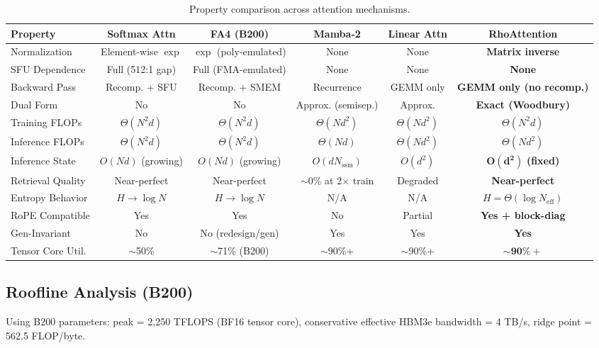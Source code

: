 \documentclass[11pt,a4paper]{article}
\theoremstyle{remark}
\begin{document}
\begin{table}[h]
\centering
\caption{Property comparison across attention mechanisms.}
\scriptsize
\begin{tabular}{lccccc}
\toprule
\textbf{Property} & \textbf{Softmax Attn} & \textbf{FA4 (B200)} & \textbf{Mamba-2} & \textbf{Linear Attn} & \textbf{RhoAttention} \\
\midrule
Normalization & Element-wise $\exp$ & $\exp$ (poly-emulated) & None & None & \textbf{Matrix inverse} \\
SFU Dependence & Full (512:1 gap) & Full (FMA-emulated) & None & None & \textbf{None} \\
Backward Pass & Recomp. + SFU & Recomp. + SMEM & Recurrence & GEMM only & \textbf{GEMM only (no recomp.)} \\
Dual Form & No & No & Approx. (semisep.) & Approx. & \textbf{Exact (Woodbury)} \\
Training FLOPs & $\Theta(N^2 d)$ & $\Theta(N^2 d)$ & $\Theta(N d^2)$ & $\Theta(N d^2)$ & $\Theta(N^2 d)$ \\
Inference FLOPs & $\Theta(N^2 d)$ & $\Theta(N^2 d)$ & $\Theta(N d)$ & $\Theta(N d^2)$ & $\Theta(N d^2)$ \\
Inference State & $O(Nd)$ (growing) & $O(Nd)$ (growing) & $O(d N_{\text{ssm}})$ & $O(d^2)$ & $\mathbf{O(d^2)}$ \textbf{(fixed)} \\
Retrieval Quality & Near-perfect & Near-perfect & $\sim$0\% at 2$\times$ train & Degraded & \textbf{Near-perfect} \\
Entropy Behavior & $H \to \log N$ & $H \to \log N$ & N/A & N/A & \textbf{$H = \Theta(\log N_{\text{eff}})$} \\
RoPE Compatible & Yes & Yes & No & Partial & \textbf{Yes + block-diag} \\
Gen-Invariant & No & No (redesign/gen) & Yes & Yes & \textbf{Yes} \\
Tensor Core Util. & $\sim$50\% & $\sim$71\% (B200) & $\sim$90\%+ & $\sim$90\%+ & $\mathbf{\sim 90\%+}$ \\
\bottomrule
\end{tabular}
\end{table}

\subsection{Roofline Analysis (B200)}

Using B200 parameters: peak = 2,250 TFLOPS (BF16 tensor core), conservative effective HBM3e bandwidth = 4 TB/s, ridge point = 562.5 FLOP/byte.
\end{document}
